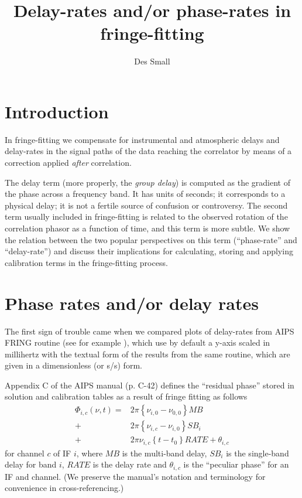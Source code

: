 \documentclass[11pt, twoside, a4paper]{article}
\author[1]{Des Small}
\affil[1]{JIVE}
\title{Delay-rates and/or phase-rates in fringe-fitting}
\begin{document}
\sloppy
\usetikzlibrary{decorations.pathmorphing}
\maketitle
\lstset{basicstyle=\ttfamily\footnotesize,breaklines=true}

\section{Introduction}
In fringe-fitting we compensate for instrumental and atmospheric delays
and delay-rates in the signal paths of the data reaching the correlator
by means of a correction applied \emph{after} correlation.

The delay term (more properly, the \emph{group delay}\cite{petrov11})
is computed as the gradient of the phase across a frequency band.  It
has units of seconds; it corresponds to a physical delay; it is not a
fertile source of confusion or controversy. The second term usually
included in fringe-fitting is related to the observed rotation of the
correlation phasor as a function of time, and this term is more subtle.
We show the relation between the two popular perspectives on this term
(``phase-rate'' and ``delay-rate'') and discuss their implications for
calculating, storing and applying calibration terms in the
fringe-fitting process.

\section{Phase rates and/or delay rates}
The first sign of trouble came when we compared plots of delay-rates
from AIPS FRING routine (see for example \cite{mao15}), which use by
default a y-axis scaled in millihertz with the textual form of the
results from the same routine, which are given in a dimensionless (or s/s) form.

Appendix C of the AIPS manual (p. C-42) defines the ``residual phase''
stored in solution and calibration tables as a result of fringe fitting
as follows
\begin{equation}\label{eq:aips:rate}
  \begin{split}
    \Phi_{i,c}(\nu, t) = &2\pi\left\{\nu_{i,0} - \nu_{0,0}\right\} \mathit{MB} \\
    + &2\pi\left\{\nu_{i,c} - \nu_{i,0}\right\} \mathit{SB}_i \\
    + &2\pi \nu_{i,c} \left\{t-t_0\right\} \mathit{RATE} + \theta_{i,c} 
  \end{split}
\end{equation}
for channel $c$
of IF $i$,
where $\mathit{MB}$
is the multi-band delay, $\mathit{SB}_i$
is the single-band delay for band $i$,
$\mathit{RATE}$
is the delay rate and $\theta_{i,c}$
is the ``peculiar phase'' for an IF and channel. (We preserve the
manual's notation and terminology for convenience in
cross-referencing.) 
\end{document}
